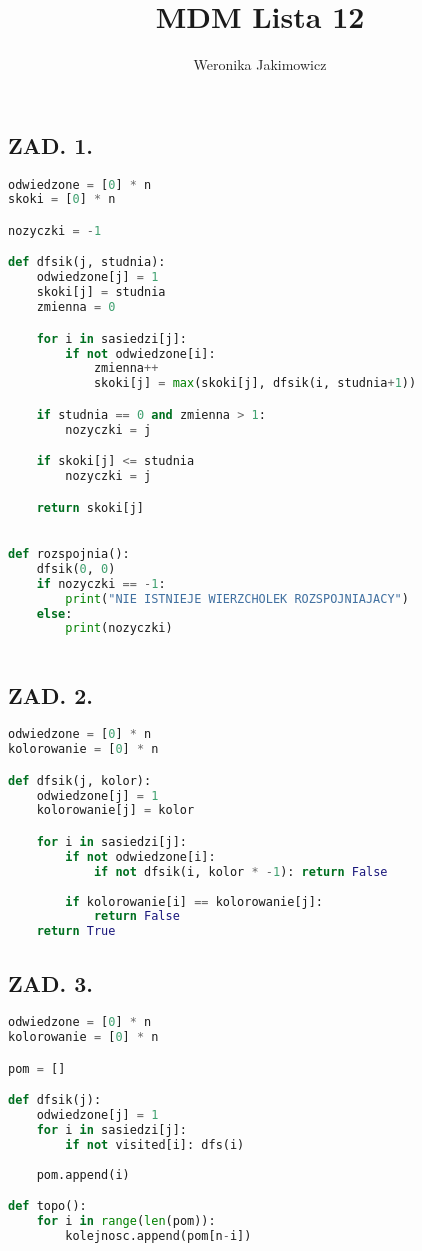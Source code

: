 \documentclass{article}
\author{Weronika Jakimowicz}
\title{MDM Lista 12}
\date{}
\begin{document}
\maketitle
\thispagestyle{empty}

\subsection*{ZAD. 1.}

\begin{lstlisting}[language=Python]
odwiedzone = [0] * n
skoki = [0] * n

nozyczki = -1

def dfsik(j, studnia):
    odwiedzone[j] = 1
    skoki[j] = studnia
    zmienna = 0

    for i in sasiedzi[j]:
        if not odwiedzone[i]:
            zmienna++
            skoki[j] = max(skoki[j], dfsik(i, studnia+1))

    if studnia == 0 and zmienna > 1:
        nozyczki = j

    if skoki[j] <= studnia
        nozyczki = j

    return skoki[j]
        

def rozspojnia():
    dfsik(0, 0)
    if nozyczki == -1:
        print("NIE ISTNIEJE WIERZCHOLEK ROZSPOJNIAJACY")
    else:
        print(nozyczki)
        


\end{lstlisting}

\subsection*{ZAD. 2.}
\begin{lstlisting}[language=Python]
odwiedzone = [0] * n
kolorowanie = [0] * n

def dfsik(j, kolor):
    odwiedzone[j] = 1
    kolorowanie[j] = kolor

    for i in sasiedzi[j]:
        if not odwiedzone[i]:
            if not dfsik(i, kolor * -1): return False
            
        if kolorowanie[i] == kolorowanie[j]:
            return False
    return True

\end{lstlisting}

\subsection*{ZAD. 3.}
\begin{lstlisting}[language=Python]
odwiedzone = [0] * n
kolorowanie = [0] * n

pom = []

def dfsik(j):
    odwiedzone[j] = 1
    for i in sasiedzi[j]:
        if not visited[i]: dfs(i)
    
    pom.append(i)

def topo():
    for i in range(len(pom)):
        kolejnosc.append(pom[n-i])
\end{lstlisting}
\end{document}
